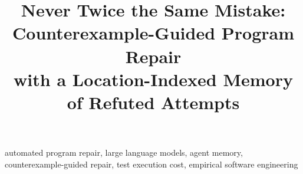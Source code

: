 \documentclass[10pt,conference]{IEEEtran}
\theoremstyle{plain}
\theoremstyle{definition}
\theoremstyle{remark}
\begin{document}
\title{Never Twice the Same Mistake: Counterexample-Guided Program Repair\\
with a Location-Indexed Memory of Refuted Attempts}

\author{
}

\maketitle

\begin{abstract}

\end{abstract}

\begin{IEEEkeywords}
automated program repair, large language models, agent memory,
counterexample-guided repair, test execution cost, empirical software
engineering
\end{IEEEkeywords}










% 







% 
\end{document}
